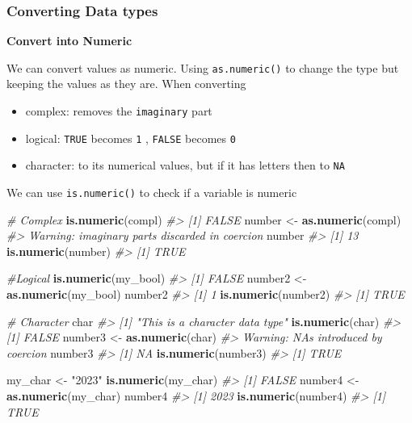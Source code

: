 \documentclass[
]{book}
\newenvironment{Shaded}{\begin{snugshade}}{\end{snugshade}}
\newcommand{\CommentTok}[1]{\textcolor[rgb]{0.56,0.35,0.01}{\textit{#1}}}
\newcommand{\FunctionTok}[1]{\textcolor[rgb]{0.13,0.29,0.53}{\textbf{#1}}}
\newcommand{\NormalTok}[1]{#1}
\newcommand{\OtherTok}[1]{\textcolor[rgb]{0.56,0.35,0.01}{#1}}
\newcommand{\StringTok}[1]{\textcolor[rgb]{0.31,0.60,0.02}{#1}}
\providecommand{\tightlist}{%
  \setlength{\itemsep}{0pt}\setlength{\parskip}{0pt}}
\begin{document}
\subsubsection*{Converting Data types}\label{converting-data-types}

\textbf{Convert into Numeric}

We can convert values as numeric. Using \texttt{as.numeric()} to change the type but keeping the values as they are.
When converting

\begin{itemize}
\tightlist
\item
  complex: removes the \texttt{imaginary} part
\item
  logical: \texttt{TRUE} becomes \texttt{1} , \texttt{FALSE} becomes \texttt{0}
\item
  character: to its numerical values, but if it has letters then to \texttt{NA}
\end{itemize}

We can use \texttt{is.numeric()} to check if a variable is numeric

\begin{Shaded}
\begin{Highlighting}[]
\CommentTok{\# Complex}
\FunctionTok{is.numeric}\NormalTok{(compl)}
\CommentTok{\#\textgreater{} [1] FALSE}
\NormalTok{number }\OtherTok{\textless{}{-}} \FunctionTok{as.numeric}\NormalTok{(compl)}
\CommentTok{\#\textgreater{} Warning: imaginary parts discarded in coercion}
\NormalTok{number}
\CommentTok{\#\textgreater{} [1] 13}
\FunctionTok{is.numeric}\NormalTok{(number)}
\CommentTok{\#\textgreater{} [1] TRUE}

\CommentTok{\#Logical }
\FunctionTok{is.numeric}\NormalTok{(my\_bool)}
\CommentTok{\#\textgreater{} [1] FALSE}
\NormalTok{number2 }\OtherTok{\textless{}{-}} \FunctionTok{as.numeric}\NormalTok{(my\_bool)}
\NormalTok{number2}
\CommentTok{\#\textgreater{} [1] 1}
\FunctionTok{is.numeric}\NormalTok{(number2)}
\CommentTok{\#\textgreater{} [1] TRUE}

\CommentTok{\# Character}
\NormalTok{char}
\CommentTok{\#\textgreater{} [1] "This is a character data type"}
\FunctionTok{is.numeric}\NormalTok{(char)}
\CommentTok{\#\textgreater{} [1] FALSE}
\NormalTok{number3 }\OtherTok{\textless{}{-}} \FunctionTok{as.numeric}\NormalTok{(char)}
\CommentTok{\#\textgreater{} Warning: NAs introduced by coercion}
\NormalTok{number3}
\CommentTok{\#\textgreater{} [1] NA}
\FunctionTok{is.numeric}\NormalTok{(number3)}
\CommentTok{\#\textgreater{} [1] TRUE}

\NormalTok{my\_char }\OtherTok{\textless{}{-}} \StringTok{"2023"}
\FunctionTok{is.numeric}\NormalTok{(my\_char)}
\CommentTok{\#\textgreater{} [1] FALSE}
\NormalTok{number4 }\OtherTok{\textless{}{-}} \FunctionTok{as.numeric}\NormalTok{(my\_char)}
\NormalTok{number4}
\CommentTok{\#\textgreater{} [1] 2023}
\FunctionTok{is.numeric}\NormalTok{(number4)}
\CommentTok{\#\textgreater{} [1] TRUE}
\end{Highlighting}
\end{Shaded}
\end{document}
